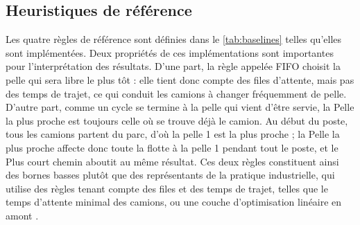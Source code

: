 \documentclass[11pt,a4paper]{article}
\newif\ifrevmarks
\newcommand{\revtag}[1]{\ifrevmarks\textsuperscript{\textcolor{red!70!black}{\scriptsize[#1]}}\fi}
\newenvironment{revbloc}[1]{\par\ifrevmarks\color{revcolor}\noindent\revtag{#1}\ \fi}{\par}
\newcommand{\aexp}[1]{\ifrevmarks\textcolor{orange!85!black}{\textbf{[EXPÉRIENCE À FAIRE : #1]}}\fi}
\newcommand{\adir}[1]{\ifrevmarks\textcolor{violet}{\textbf{[À VALIDER AVEC LA DIRECTRICE : #1]}}\fi}
\begin{document}
\subsection{Heuristiques de référence}
\label{sec:baselines-def}

\begin{revbloc}{M25, M16, Dir. corr. 1, A}
Les quatre règles de référence sont définies dans le \cref{tab:baselines} telles qu'elles sont implémentées. Deux propriétés de ces implémentations sont importantes pour l'interprétation des résultats. D'une part, la règle appelée FIFO choisit la pelle qui sera libre le plus tôt : elle tient donc compte des files d'attente, mais pas des temps de trajet, ce qui conduit les camions à changer fréquemment de pelle. D'autre part, comme un cycle se termine à la pelle qui vient d'être servie, la Pelle la plus proche est toujours celle où se trouve déjà le camion. Au début du poste, tous les camions partent du parc, d'où la pelle 1 est la plus proche ; la Pelle la plus proche affecte donc toute la flotte à la pelle 1 pendant tout le poste, et le Plus court chemin aboutit au même résultat. Ces deux règles constituent ainsi des bornes basses plutôt que des représentants de la pratique industrielle, qui utilise des règles tenant compte des files et des temps de trajet, telles que le temps d'attente minimal des camions, ou une couche d'optimisation linéaire en amont \cite{Zeng2022, Soumis1989, AmandaSmith2020}.
\end{revbloc}

\aexp{ajouter au moins une règle tenant compte des files et des trajets, telle que le temps d'attente minimal des camions, et une politique fondée sur un programme linéaire de taux de flux cibles (M25).}

\adir{conserver Pelle la plus proche et Plus court chemin comme bornes basses, ou les rendre réalistes en prenant la décision d'affectation à la verse, après le déversement. Modifier seulement la règle pour mesurer la distance depuis la verse ne suffit pas : dans le simulateur, le camion est déjà revenu à son ancienne pelle quand il reçoit sa nouvelle affectation. Cette option modifie le simulateur pour toutes les politiques et impose de réentraîner les agents (plan de correction, T16 bis et T21).}
\end{document}
